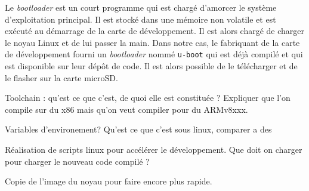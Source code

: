 Le \textit{bootloader} est un court programme qui est chargé d'amorcer le système d'exploitation principal. Il est stocké dans une mémoire non volatile et est exécuté au démarrage de la carte de développement. Il est alors chargé de charger le noyau Linux et de lui passer la main. Dans notre cas, le fabriquant de la carte de développement fourni un \textit{bootloader} nommé \texttt{u-boot} qui est déjà compilé et qui est disponible sur leur dépôt de code. Il est alors possible de le télécharger et de le flasher sur la carte microSD.


\vspace{10pt}

\color{red}
Toolchain : qu'est ce que c'est, de quoi elle est constituée ? Expliquer que l'on compile sur du x86 mais qu'on veut compiler pour du ARMv8xxx.

Variables d'environement? Qu'est ce que c'est sous linux, comparer a des 

Réalisation de scripts linux pour accélérer le développement. Que doit on charger pour charger le nouveau code compilé ?

Copie de l'image du noyau pour faire encore plus rapide.
\color{black}